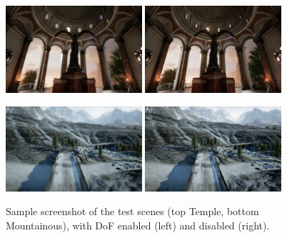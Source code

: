 \begin{figure}
        \centering
            \includegraphics[width=0.45\textwidth]{images/lighton.png}
            \includegraphics[width=0.45\textwidth]{images/lightoff.png}

            \includegraphics[width=0.45\textwidth]{images/landscapeOn.png}
            \includegraphics[width=0.45\textwidth]{images/landscapeOff.png}
            
            \caption{Sample screenshot of the test scenes (top Temple, bottom Mountainous), with DoF enabled (left) and disabled (right).}
            \label{fig:temple1}
\end{figure}



